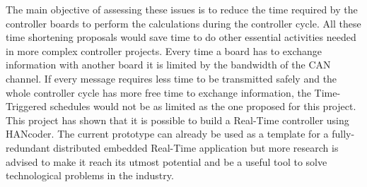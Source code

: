 \documentclass[table,xcdraw]{article}
\begin{document}
The main objective of assessing these issues is to reduce the time required by the controller boards to perform the calculations during the controller cycle. All these time shortening proposals would save time to do other essential activities needed in more complex controller projects. Every time a board has to exchange information with another board it is limited by the bandwidth of the CAN channel. If every message requires less time to be transmitted safely and the whole controller cycle has more free time to exchange information, the Time-Triggered schedules would not be as limited as the one proposed for this project.\\

This project has shown that it is possible to build a Real-Time controller using HANcoder. The current prototype can already be used as a template for a fully-redundant distributed embedded Real-Time application but more research is advised to make it reach its utmost potential and be a useful tool to solve technological problems in the industry.




\newpage
% 

\printbibliography[title=Bibliography]

\newpage
\appendix

\end{document}
